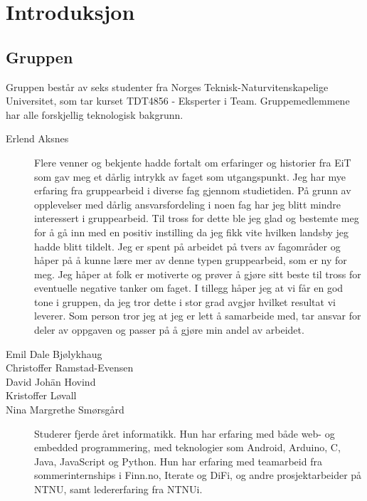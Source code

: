 \chapter{Introduksjon}
\section{Gruppen}
Gruppen består av seks studenter fra Norges Teknisk-Naturvitenskapelige 
Universitet, som tar kurset TDT4856 - Eksperter i Team. Gruppemedlemmene 
har alle forskjellig teknologisk bakgrunn.
\begin{description}
	\item[Erlend Aksnes] Flere venner og bekjente hadde fortalt om erfaringer og historier fra EiT som gav meg et dårlig intrykk av faget som utgangspunkt. Jeg har mye erfaring fra gruppearbeid i diverse fag gjennom studietiden. På grunn av opplevelser med dårlig ansvarsfordeling i noen fag har jeg blitt mindre interessert i gruppearbeid. Til tross for dette ble jeg glad og bestemte meg for å gå inn med en positiv instilling da jeg fikk vite hvilken landsby jeg hadde blitt tildelt. Jeg er spent på arbeidet på tvers av fagområder og håper på å kunne lære mer av denne typen gruppearbeid, som er ny for meg.  Jeg håper at folk er motiverte og prøver å gjøre sitt beste til tross for eventuelle negative tanker om faget. I tillegg håper jeg at vi får en god tone i gruppen, da jeg tror dette i stor grad avgjør hvilket resultat vi leverer. Som person tror jeg at jeg er lett å samarbeide med, tar ansvar for deler av oppgaven og passer på å gjøre min andel av arbeidet. 
	\item[Emil Dale Bjølykhaug] %
	\item[Christoffer Ramstad-Evensen] %
	\item[David Johän Hovind] %
	\item[Kristoffer Løvall] %
	\item[Nina Margrethe Smørsgård] \comment{\hfill \\}Studerer fjerde året 
	informatikk. Hun har erfaring med både web- og embedded programmering, med 
	teknologier som Android, Arduino, C, Java, JavaScript og Python. Hun har 
	erfaring med teamarbeid fra sommerinternships i Finn.no, Iterate og DiFi, 
	og andre prosjektarbeider på NTNU, samt ledererfaring fra NTNUi.
\end{description}
